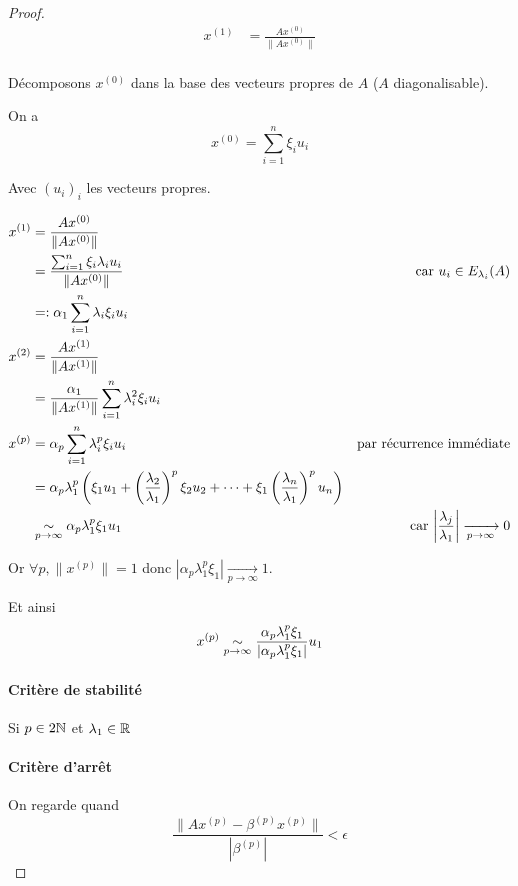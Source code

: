 \documentclass{article}
\begin{document}
\begin{proof}
	\begin{align*}
		x^{(1)} &= \frac{Ax^{(0)}}{\|A x^{(0)}\|} \\
	\end{align*}

	Décomposons $x^{(0)}$ dans la base des vecteurs propres de $A$ ($A$ diagonalisable).

	On a \[
		x^{(0)} = \sum_{i=1}^{n} \xi_i u_i
	\]

	Avec $(u_i)_i$ les vecteurs propres.

	
	\begin{align*}
		x^{(1)} &= \frac{Ax^{(0)}}{\|A x^{(0)}\|} \\
		&= \frac{\sum_{i=1}^{n} \xi_i \lambda_i u_i}{\| A x^{(0)} \|} \quad&\text{car $u_i \in E_{\lambda_i}(A)$} \\
		&=: \alpha_1 \sum_{i=1}^{n} \lambda_i \xi_i u_i \\
		x^{(2)} &= \frac{Ax^{(1)}}{\|Ax^{(1)}\|} \\
		&= \frac{\alpha_1}{\|A x^{(1)}\|} \sum_{i=1}^{n} \lambda_i^2 \xi_i u_i \\
		x^{(p)} &= \alpha_p \sum_{i=1}^{n} \lambda_i^p \xi_i u_i \quad&\text{par récurrence immédiate} \\
		&= \alpha_p \lambda_1^p \left(\xi_1 u_1 + \left( \frac{\lambda_2}{\lambda_1} \right)^{p} \xi_2 u_2 + \cdots + \xi_1 \left( \frac{\lambda_n}{\lambda_1} \right)^p u_n \right) \\
		&\underset{p\to \infty}{\sim} \alpha_p \lambda_1^p \xi_1 u_1 \quad&\text{car $\left| \frac{\lambda_j}{\lambda_1}\right| \xrightarrow[p \to \infty]{} 0$}
	\end{align*}

	Or $\forall p, \|x^{(p)}\| = 1$ donc $|\alpha_p \lambda_1^p \xi_1| \xrightarrow[p\to \infty]{} 1$.

	Et ainsi
	\[
		x^{(p)} \underset{p\to \infty}{\sim} \frac{\alpha_p \lambda_1^p \xi_1}{|\alpha_p \lambda_1^p \xi_1|} u_1
	\] 

	\paragraph{Critère de stabilité}
	Si $p\in 2\mathbb{N}$ et $\lambda_1\in \mathbb{R}$

	\paragraph{Critère d'arrêt}
	On regarde quand \[
		\frac{\| Ax^{(p)} - \beta^{(p)} x^{(p)} \|}{|\beta^{(p)}|} < \epsilon
	\] 
\end{proof}
\end{document}
